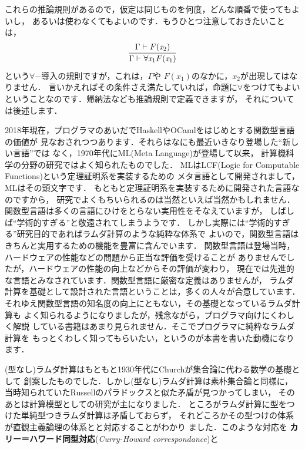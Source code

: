\documentclass{ltjsbook}%
\newcommand\term[2]{\textbf{#1}{(\textit{#2})}}%
\begin{document}
これらの推論規則があるので，仮定は同じものを何度，どんな順番で使ってもよいし，%
あるいは使わなくてもよいのです．もうひとつ注意しておきたいことは，%
\begin{equation}%
  \infer{%
    \Gamma\vdash\forall\mathit{x}_1F(\mathit{x}_1)%
  }{%
    \Gamma\vdash F(\mathit{x}_2)%
  }%
\end{equation}%
という$\forall-導入$の規則ですが，これは，$\Gamma$や%
$F(\mathit{x}_1)$のなかに，$\mathit{x}_2$が出現してはなりません．%
言いかえればその条件さえ満たしていれば，命題に$\forall$をつけてもよい%
ということなのです．帰納法なども推論規則で定義できますが，%
それについては後述します．%
\fi%
\iffalse%
\par 2018年現在，プログラマのあいだでHaskellやOCamlをはじめとする関数型言語の価値が%
見なおされつつあります．それらはなにも最近いきなり登場した``新しい言語''では%
なく，1970年代にML(Meta Language)が登場して以来，%
計算機科学の分野の研究ではよく知られたものでした．%
MLはLCF(Logic for Computable Functions)という定理証明系を実装するための%
メタ言語として開発されまして，MLはその頭文字です．%
もともと定理証明系を実装するために開発された言語なのですから，%
研究でよくもちいられるのは当然といえば当然かもしれません．%
関数型言語は多くの言語にひけをとらない実用性をそなえていますが，%
しばしば``学術的すぎる''と敬遠されてしまうようです．%
しかし実際には``学術的すぎる''研究目的であればラムダ計算のような純粋な体系で%
よいので，関数型言語はきちんと実用するための機能を豊富に含んでいます．%
関数型言語は登場当時，ハードウェアの性能などの問題から正当な評価を受けることが%
ありませんでしたが，ハードウェアの性能の向上などからその評価が変わり，%
現在では先進的な言語とみなされています．関数型言語に厳密な定義はありませんが，%
ラムダ計算を基礎として設計された言語ということは，多くの人々が合意しています．%
それゆえ関数型言語の知名度の向上にともない，その基礎となっているラムダ計算も%
よく知られるようになりましたが，残念ながら，プログラマ向けにくわしく解説%
している書籍はあまり見られません．そこでプログラマに純粋なラムダ計算を%
もっとくわしく知ってもらいたい，というのが本書を書いた動機になります．%
\par(型なし)ラムダ計算はもともと1930年代にChurchが集合論に代わる数学の基礎として%
創案したものでした．しかし(型なし)ラムダ計算は素朴集合論と同様に，%
当時知られていたRussellのパラドックスと似た矛盾が見つかってしまい，%
そのあとは計算模型としての研究が主になりました．%
ところがラムダ計算に型をつけた単純型つきラムダ計算は矛盾しておらず，%
それどころかその型つけの体系が直観主義論理の体系とと対応することがわかり%
ました．このような対応を%
\term{カリー＝ハワード同型対応}{Curry-Howard correspondance}と%
\end{document}
